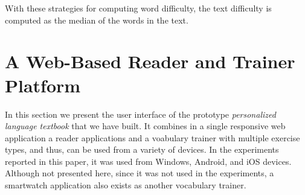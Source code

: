 With these strategies for computing word difficulty, the text difficulty is computed as the median of the words in the text. 


\newpage
\section{A Web-Based Reader and Trainer Platform}


	
	In this section we present the user interface of the prototype {\em personalized language textbook} that we have built. It combines in a single responsive web application a reader applications and a voabulary trainer with multiple exercise types, and thus, can be used from a variety of devices. In the experiments reported in this paper, it was used from Windows, Android, and iOS devices. Although not presented here, since it was not used in the experiments, a smartwatch application also exists as another vocabulary trainer.











